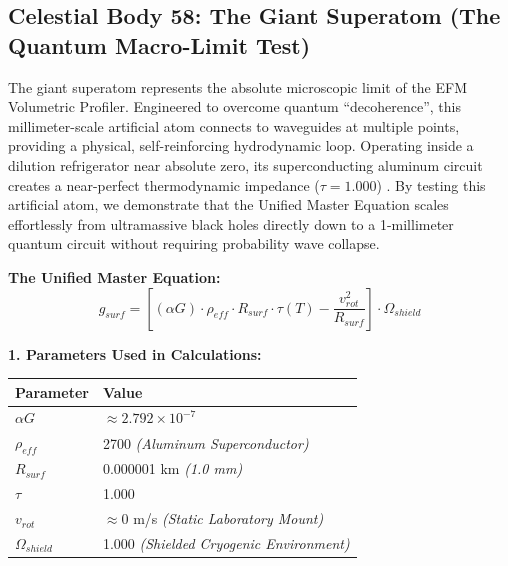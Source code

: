 \documentclass[11pt, a4paper]{article}
\begin{document}
\clearpage
\subsection{Celestial Body 58: The Giant Superatom (The Quantum Macro-Limit Test)}
  The giant superatom represents the absolute microscopic limit of the EFM Volumetric Profiler. Engineered to overcome quantum ``decoherence'', this millimeter-scale artificial atom connects to waveguides at multiple points, providing a physical, self-reinforcing hydrodynamic loop. Operating inside a dilution refrigerator near absolute zero, its superconducting aluminum circuit creates a near-perfect thermodynamic impedance ($\tau=1.000$) \cite{superatom2026}. By testing this artificial atom, we demonstrate that the Unified Master Equation scales effortlessly from ultramassive black holes directly down to a 1-millimeter quantum circuit without requiring probability wave collapse.

  \vspace{0.5em}
  \noindent \textbf{The Unified Master Equation:}
  $$ g_{surf} = \left[ (\alpha G) \cdot \rho_{eff} \cdot R_{surf} \cdot \tau(T) - \frac{v_{rot}^2}{R_{surf}} \right] \cdot \Omega_{shield} $$

  \vspace{0.5em}
  \noindent \textbf{1. Parameters Used in Calculations:} \\[0.5em]
  \begingroup
  \renewcommand{\arraystretch}{1.3}
  \hspace*{2em}
  \begin{tabular}{|l|l|}
    \hline
    \textbf{Parameter} & \textbf{Value} \\ \hline
    $\alpha G$ & $\approx 2.792 \times 10^{-7}$ \\ \hline
    $\rho_{eff}$ & 2700 \textit{(Aluminum Superconductor)} \\ \hline
    $R_{surf}$ & 0.000001 km \textit{(1.0 mm)} \\ \hline
    $\tau$ & 1.000 \\ \hline
    $v_{rot}$ & $\approx 0$ m/s \textit{(Static Laboratory Mount)} \\ \hline
    $\Omega_{shield}$ & 1.000 \textit{(Shielded Cryogenic Environment)} \\ \hline
  \end{tabular}
  \endgroup
\end{document}

